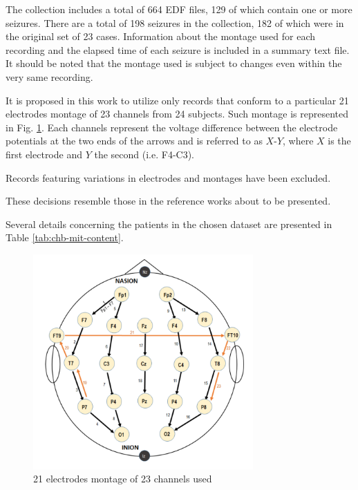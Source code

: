 The collection includes a total of 664 \gls{EDF} files, 129 of which contain one or more seizures. There are a total of 198 seizures in the collection, 182 of which were in the original set of 23 cases. Information about the montage used for each recording and the elapsed time of each seizure is included in a summary text file. It should be noted that the montage used is subject to changes even within the very same recording.

It is proposed in this work to utilize only records that conform to a particular 21 electrodes montage of 23 channels from 24 subjects. 
Such montage is represented in Fig. \ref{fig:23-channels-montage}.
Each channels represent the voltage difference between the electrode potentials at the two ends of the arrows and is referred to as $X$-$Y$, where $X$ is the first electrode and $Y$ the second (i.e. F4-C3).

Records featuring variations in electrodes and montages have been excluded. 

These decisions resemble those in the reference works about to be presented.

Several details concerning the patients in the chosen dataset are presented in Table \ref{tab:chb-mit-content}.

\begin{figure}[ht]
    \centering
    \includegraphics[width=0.75\textwidth]{images/State-of-art/23-channels-montage.png}
    \caption{21 electrodes montage of 23 channels used}
    \label{fig:23-channels-montage}
\end{figure}

